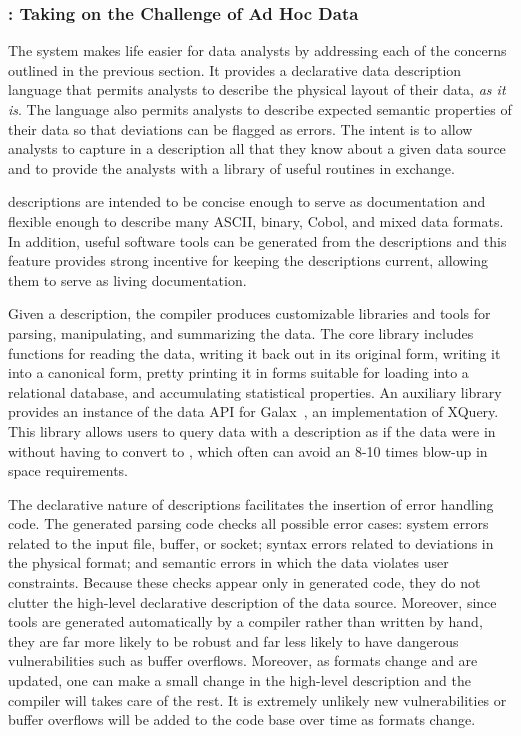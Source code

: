 \documentclass[11pt]{article}
\begin{document}
\subsubsection{\pads{}:  Taking on the Challenge of Ad Hoc Data}

The \pads{} system makes life easier for data analysts by addressing
each of the concerns outlined in the previous section.
It provides a declarative data description
language that permits analysts to describe the physical layout of
their data, \textit{as it is}.  The language also permits analysts to
describe expected semantic properties of their data so that deviations can
be flagged as errors. The intent is to allow analysts to capture in a
\pads{} description all that they know about a given data source
and to provide the analysts with a library of useful routines in exchange. 


\pads{} descriptions are intended to be concise enough to serve as
documentation and flexible enough to describe many ASCII, binary,
Cobol, and mixed data formats.  In addition, useful software tools
can be generated from the descriptions and this feature provides
strong incentive for keeping the descriptions current, allowing them
to serve as living documentation.  

Given a \pads{} description, the \pads{} compiler produces
customizable \C{} libraries and tools for parsing, manipulating, and
summarizing the data.  The core \C{} library includes functions for
reading the data, writing it back out in its original form, writing it
into a canonical \xml{} form, pretty printing it in forms suitable for
loading into a relational database, and accumulating statistical
properties.  An auxiliary library provides an instance of the data API
for Galax~\cite{galax,galaxmanual}, an implementation of XQuery.  This
library allows users to query data with a \pads{} description as if
the data were in \xml{} without having to convert to \xml, which often
can avoid an 8-10 times blow-up in space requirements.  

The declarative nature of \pads{} descriptions facilitates the
insertion of error handling code.  The generated parsing code checks
all possible error cases: system errors related to the input file,
buffer, or socket; syntax errors related to deviations in the physical
format; and semantic errors in which the data violates user
constraints.  Because these checks appear only in generated code, they
do not clutter the high-level declarative description of the data
source.  Moreover, since tools are generated
automatically by a compiler rather than written by hand, 
they are far more likely to be robust
and far less likely to have dangerous vulnerabilities such as
buffer overflows.  Moreover, as formats change and are updated,
one can make a small change in the high-level description
and the compiler will takes care of the rest.  It is extremely unlikely
new vulnerabilities or buffer overflows will be added to the code
base over time as formats change.
\end{document}
